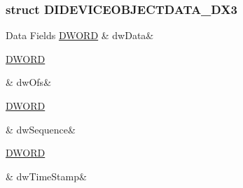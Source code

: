 \subsubsection{struct D\-I\-D\-E\-V\-I\-C\-E\-O\-B\-J\-E\-C\-T\-D\-A\-T\-A\-\_\-\-D\-X3}
\begin{DoxyFields}{Data Fields}
\hypertarget{a00003_ad38b92af7d164a277eb2d30b5e65a489}{\hyperlink{a00003_a50e15ae51c87ae06ab29c8148cb5f36c}{D\-W\-O\-R\-D}}\label{a00003_ad38b92af7d164a277eb2d30b5e65a489}
&
dw\-Data&
\\
\hline

\hypertarget{a00003_a2f0da10f0bff2a910138cc1b5715cdd5}{\hyperlink{a00003_a50e15ae51c87ae06ab29c8148cb5f36c}{D\-W\-O\-R\-D}}\label{a00003_a2f0da10f0bff2a910138cc1b5715cdd5}
&
dw\-Ofs&
\\
\hline

\hypertarget{a00003_a62ab582c7122462282999b7ee4e41e09}{\hyperlink{a00003_a50e15ae51c87ae06ab29c8148cb5f36c}{D\-W\-O\-R\-D}}\label{a00003_a62ab582c7122462282999b7ee4e41e09}
&
dw\-Sequence&
\\
\hline

\hypertarget{a00003_a0c07d43e437af5d01b1f043f0744d598}{\hyperlink{a00003_a50e15ae51c87ae06ab29c8148cb5f36c}{D\-W\-O\-R\-D}}\label{a00003_a0c07d43e437af5d01b1f043f0744d598}
&
dw\-Time\-Stamp&
\\
\hline

\end{DoxyFields}
\label{d9/da4/a00078}
\hypertarget{a00003_d9/da4/a00078}{}
